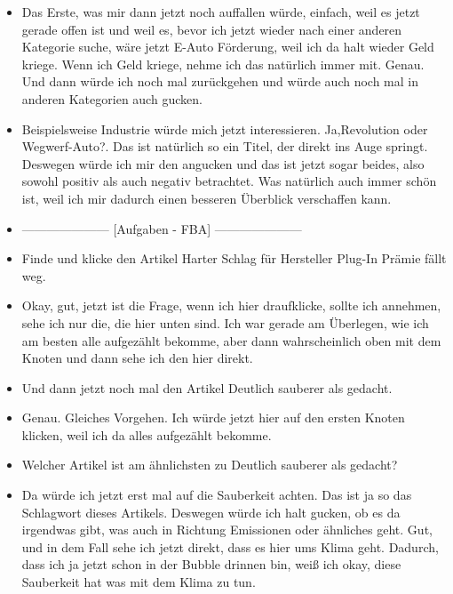{\begin{itemize}[]
        \item {} Das Erste, was mir dann jetzt noch auffallen würde, einfach, weil es jetzt gerade offen ist und weil es, bevor ich jetzt wieder nach einer anderen Kategorie suche, wäre jetzt \flqq E-Auto Förderung\frqq{}, weil ich da halt wieder Geld kriege.
              Wenn ich Geld kriege, nehme ich das natürlich immer mit.
              Genau.
              Und dann würde ich noch mal zurückgehen und würde auch noch mal in anderen Kategorien auch gucken.
        \item {} Beispielsweise Industrie würde mich jetzt interessieren.
              Ja,\flqq Revolution oder Wegwerf-Auto?\frqq{}.
              Das ist natürlich so ein Titel, der direkt ins Auge springt.
              Deswegen würde ich mir den angucken und das ist jetzt sogar beides, also sowohl positiv als auch negativ betrachtet.
              Was natürlich auch immer schön ist, weil ich mir dadurch einen besseren Überblick verschaffen kann.
        \item {---------------------} [Aufgaben - FBA] {---------------------}
        \item {} Finde und klicke den Artikel \flqq Harter Schlag für Hersteller Plug-In Prämie fällt weg\frqq{}.
        \item {} Okay, gut, jetzt ist die Frage, wenn ich hier draufklicke, sollte ich annehmen, sehe ich nur die, die hier unten sind.
              Ich war gerade am Überlegen, wie ich am besten alle aufgezählt bekomme, aber dann wahrscheinlich oben mit dem Knoten und dann sehe ich den hier direkt.
        \item {} Und dann jetzt noch mal den Artikel \flqq Deutlich sauberer als gedacht\frqq{}.
        \item {} Genau. Gleiches Vorgehen. Ich würde jetzt hier auf den ersten Knoten klicken, weil ich da alles aufgezählt bekomme.
        \item {} Welcher Artikel ist am ähnlichsten zu \flqq Deutlich sauberer als gedacht\frqq{}?
        \item {} Da würde ich jetzt erst mal auf die Sauberkeit achten.
              Das ist ja so das Schlagwort dieses Artikels.
              Deswegen würde ich halt gucken, ob es da irgendwas gibt, was auch in Richtung Emissionen oder ähnliches geht.
              Gut, und in dem Fall sehe ich jetzt direkt, dass es hier ums Klima geht.
              Dadurch, dass ich ja jetzt schon in der Bubble drinnen bin, weiß ich okay, diese Sauberkeit hat was mit dem Klima zu tun.

\end{itemize}}
